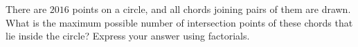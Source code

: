 There are $2016$ points on a circle, and all chords joining pairs of them are drawn. What is the maximum possible number of intersection points of these chords that lie inside the circle? Express your answer using factorials.
